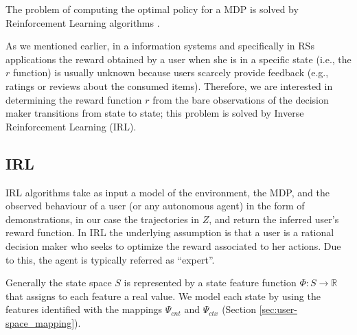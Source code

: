 The problem of computing the optimal policy for a MDP is solved by Reinforcement Learning algorithms \cite{sutton:1998}.

As we mentioned earlier, in a information systems and specifically in RSs applications the reward obtained by a user when she is in a specific state (i.e., the $r$ function) is usually unknown because users scarcely provide feedback (e.g., ratings or reviews about the consumed items). Therefore, we are interested in determining the reward function $r$ from the bare observations of the decision maker transitions from state to state; this problem is solved by Inverse Reinforcement Learning (IRL). 


\subsection{IRL}
IRL algorithms take as input a model of the environment, the MDP, and the observed behaviour of a user (or any autonomous agent) in the form of demonstrations, in our case the trajectories in $Z$,
and return the inferred user's reward function. In IRL the underlying assumption is that a user is a rational decision maker who seeks to optimize the reward associated to her actions. Due to this, the agent is typically referred as ``expert''.

Generally the state space $S$ is represented by a state feature function $\Phi:S \rightarrow \mathbb{R}$ that assigns to each feature a real value.
We model each state by using the features identified with the mappings $\Psi_{cnt}$ and $\Psi_{ctx}$ (Section \ref{sec:user-space_mapping}).


